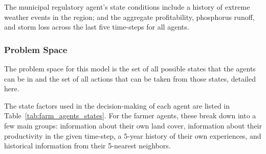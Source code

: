 The municipal regulatory agent's state conditions include a history of 
extreme weather events in the region; and the aggregate profitability, 
phosphorus runoff, and storm loss across the last five time-steps for all 
agents.

\subsubsection{Problem Space}

The problem space for this model is the set of all possible states that the
agents can be in and the set of all actions that can be taken from those
states, detailed here.

The state factors used in the decision-making of each agent are listed
in Table~\ref{tab:farm_agents_states}.
For the farmer agents, these break down into a few main groups:
information about their own land cover,
information about their productivity in the given time-step,
a 5-year history of their own experiences,
and historical information from their 5-nearest neighbors.


